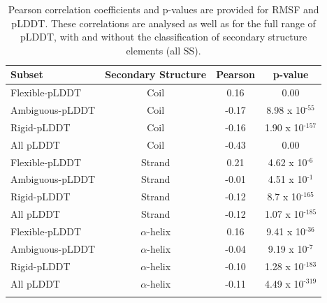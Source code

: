 \begin{table}[H]
\centering
\small
\caption{Pearson correlation coefficients and p-values are provided for RMSF and pLDDT. These correlations are analysed as well as for the full range of pLDDT, with and without the classification of secondary structure elements (all SS).}
\label{tab:plddt_sup:suptable7}
\begin{tabular}{@{}lccc@{}}
\toprule
Subset                         & Secondary Structure & \multicolumn{1}{c}{Pearson} & \multicolumn{1}{c}{p-value}  \\ \midrule
Flexible-pLDDT                      & Coil                & 0.16                        & 0.00                         \\
Ambiguous-pLDDT                      & Coil                & -0.17                       & 8.98 x 10$^{\text{-55}}$     \\
Rigid-pLDDT                     & Coil                & -0.16                       & 1.90 x 10$^{\text{-157}}$    \\
All pLDDT                      & Coil                & -0.43                       & 0.00                         \\
\arrayrulecolor[gray]{0.8}\hline
Flexible-pLDDT                      & Strand              & 0.21                        & 4.62 x 10$^{\text{-6}}$      \\
Ambiguous-pLDDT                      & Strand              & -0.01                       & 4.51 x 10$^{\text{-1}}$      \\
Rigid-pLDDT                     & Strand              & -0.12                       & 8.7 x 10$^{\text{-165}}$     \\
All pLDDT                      & Strand              & -0.12                       & 1.07 x 10$^{\text{-185}}$    \\
\arrayrulecolor[gray]{0.8}\hline
Flexible-pLDDT                      & $\alpha$-helix      & 0.16                        & 9.41 x 10$^{\text{-36}}$     \\
Ambiguous-pLDDT                      & $\alpha$-helix      & -0.04                       & 9.19 x 10$^{\text{-7}}$      \\
Rigid-pLDDT                     & $\alpha$-helix      & -0.10                       & 1.28 x 10$^{\text{-183}}$    \\
All pLDDT                      & $\alpha$-helix      & -0.11                       & 4.49 x 10$^{\text{-319}}$    \\
\arrayrulecolor[gray]{0.8}\hline

\end{tabular}
\end{table}
